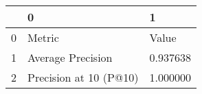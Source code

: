 \begin{tabular}{lll}
\toprule
 & 0 & 1 \\
\midrule
0 & Metric & Value \\
1 & Average Precision & 0.937638 \\
2 & Precision at 10 (P@10) & 1.000000 \\
\bottomrule
\end{tabular}
